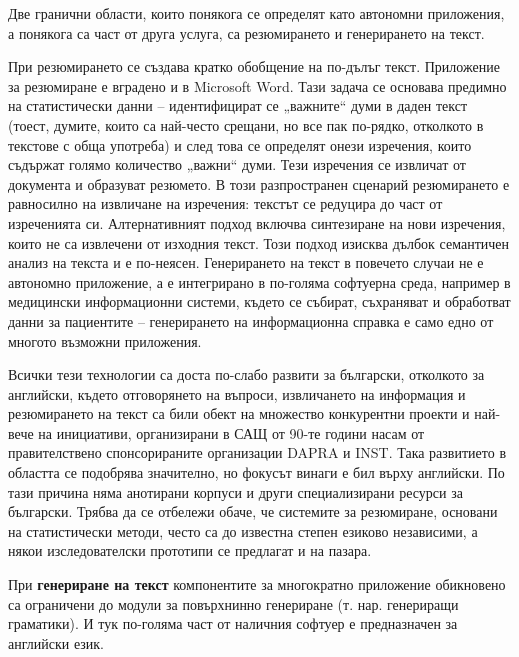 \documentclass[]{../../metanetpaper}
\begin{document}
\begin{multicols}{2}
Две гранични области, които понякога се определят като автономни приложения, а понякога са част от друга услуга, са резюмирането и генерирането на текст. 


При резюмирането се създава кратко обобщение на по-дълъг текст. Приложение за резюмиране е вградено и в Microsoft Word. Тази задача се основава предимно на статистически данни -- идентифицират се „важните“ думи в даден текст (тоест, думите, които са най-често срещани, но все
 пак по-рядко, отколкото в текстове с обща употреба) и
 след това се определят онези изречения, които съдържат
 голямо количество „важни“ думи. Тези изречения се извличат от документа и образуват резюмето. В този разпространен сценарий резюмирането е равносилно на извличане на изречения: текстът се редуцира до част от изреченията си.
 Алтернативният подход включва синтезиране на нови
 изречения, които не са извлечени от изходния текст. Този подход изисква дълбок семантичен анализ на текста и е по-неясен. Генерирането на текст в повечето случаи не е автономно приложение, а е интегрирано в по-голяма софтуерна среда, например в медицински информационни системи, където се събират, съхраняват и обработват данни за пациентите -- генерирането на информационна справка е само едно от многото възможни приложения.
 

Всички тези технологии са доста по-слабо развити за български, отколкото за английски, където отговорянето на въпроси, извличането на информация
 и резюмирането на текст са били обект на множество конкурентни проекти и най-вече на инициативи, организирани в САЩ от 90-те години насам от правителствено спонсорираните организации DAPRA и INST. Така развитието в областта се подобрява значително, но фокусът винаги е бил върху английски. По тази причина няма анотирани корпуси и други специализирани ресурси за български. Трябва да се отбележи обаче, че системите за резюмиране, основани на статистически методи, често са до известна степен езиково независими, а някои изследователски прототипи се предлагат и на пазара.

При \textbf{генериране на текст} компонентите за многократно приложение обикновено са
 ограничени до модули за повърхнинно генериране (т. нар. генериращи граматики). И тук по-голяма част от наличния софтуер е предназначен за английски език.


\end{multicols}
\end{document}
